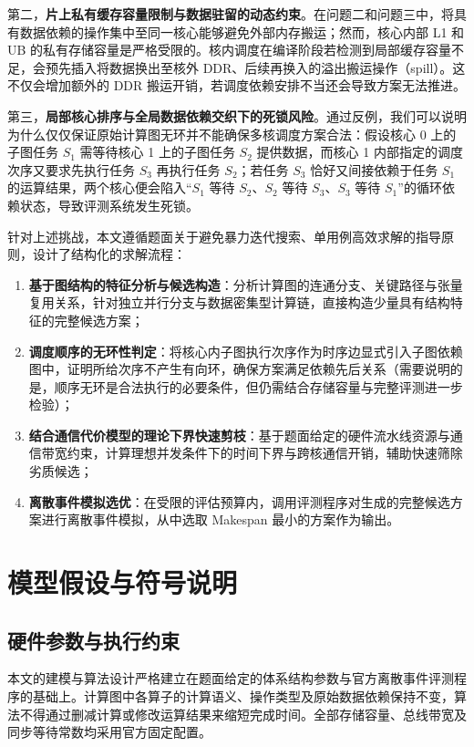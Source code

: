 \documentclass[anonymous,notoc]{gmcm2026}
\providecommand{\tightlist}{\setlength{\itemsep}{0pt}\setlength{\parskip}{0pt}}
\begin{document}
第二，\textbf{片上私有缓存容量限制与数据驻留的动态约束}。在问题二和问题三中，将具有数据依赖的操作集中至同一核心能够避免外部内存搬运；然而，核心内部 L1 和 UB 的私有存储容量是严格受限的。核内调度在编译阶段若检测到局部缓存容量不足，会预先插入将数据换出至核外 DDR、后续再换入的溢出搬运操作（spill）。这不仅会增加额外的 DDR 搬运开销，若调度依赖安排不当还会导致方案无法推进。

第三，\textbf{局部核心排序与全局数据依赖交织下的死锁风险}。通过反例，我们可以说明为什么仅仅保证原始计算图无环并不能确保多核调度方案合法：假设核心 0 上的子图任务 \(S_1\) 需等待核心 1 上的子图任务 \(S_2\) 提供数据，而核心 1 内部指定的调度次序又要求先执行任务 \(S_3\) 再执行任务 \(S_2\)；若任务 \(S_3\) 恰好又间接依赖于任务 \(S_1\) 的运算结果，两个核心便会陷入``\(S_1\) 等待 \(S_2\)、\(S_2\) 等待 \(S_3\)、\(S_3\) 等待 \(S_1\)''的循环依赖状态，导致评测系统发生死锁。

针对上述挑战，本文遵循题面关于避免暴力迭代搜索、单用例高效求解的指导原则，设计了结构化的求解流程：

\begin{enumerate}
\def\labelenumi{\arabic{enumi}.}
\tightlist
\item
  \textbf{基于图结构的特征分析与候选构造}：分析计算图的连通分支、关键路径与张量复用关系，针对独立并行分支与数据密集型计算链，直接构造少量具有结构特征的完整候选方案；
\item
  \textbf{调度顺序的无环性判定}：将核心内子图执行次序作为时序边显式引入子图依赖图中，证明所给次序不产生有向环，确保方案满足依赖先后关系（需要说明的是，顺序无环是合法执行的必要条件，但仍需结合存储容量与完整评测进一步检验）；
\item
  \textbf{结合通信代价模型的理论下界快速剪枝}：基于题面给定的硬件流水线资源与通信带宽约束，计算理想并发条件下的时间下界与跨核通信开销，辅助快速筛除劣质候选；
\item
  \textbf{离散事件模拟选优}：在受限的评估预算内，调用评测程序对生成的完整候选方案进行离散事件模拟，从中选取 Makespan 最小的方案作为输出。
\end{enumerate}


\section{模型假设与符号说明}

\subsection{硬件参数与执行约束}

本文的建模与算法设计严格建立在题面给定的体系结构参数与官方离散事件评测程序的基础上。计算图中各算子的计算语义、操作类型及原始数据依赖保持不变，算法不得通过删减计算或修改运算结果来缩短完成时间。全部存储容量、总线带宽及同步等待常数均采用官方固定配置\cite{ref1}。
\end{document}
